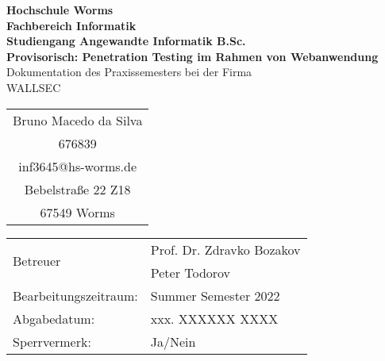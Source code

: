 \begin{titlepage}
    \vspace*{2mm}
    \begin{center}
        \Large
        \textbf{Hochschule Worms}\\
        \textbf{Fachbereich Informatik}\\
        \textbf{Studiengang Angewandte Informatik B.Sc.}\\
        \vspace{1cm}
        \textbf{Provisorisch: Penetration Testing im Rahmen von Webanwendung}\\
        \vspace{1cm}
        \large
        Dokumentation des Praxissemesters bei der Firma\\
        \Large{WALLSEC}
        \vspace{2cm}
        \begin {table}[ht]
        \centering
            \begin{tabular}{c}
                Bruno Macedo da Silva  \\ 
                676839                \\
                inf3645@hs-worms.de   \\
                Bebelstraße 22 Z18    \\
                67549 Worms            \\
            \end{tabular}
        \end {table}
        \vspace{2cm}
        \large
        \vspace{1cm}
        \begin{table}[h]
            \centering
            \begin{tabular}{l l}
                \multirow{2}{*}{Betreuer}         & Prof. Dr. Zdravko Bozakov \\
                                                  & Peter Todorov \\
                Bearbeitungszeitraum:    & Summer Semester 2022 \\
                Abgabedatum:          & xxx. XXXXXX XXXX \\
                Sperrvermerk: & Ja/Nein \\
            \end{tabular}
        \end{table}    
    \end{center}
    \normalsize
    \vfill
\end{titlepage}